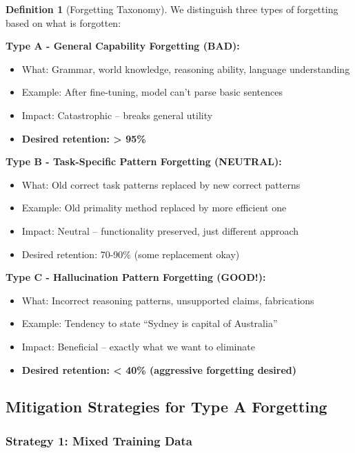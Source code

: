 \documentclass[12pt,a4paper]{article}
\theoremstyle{definition}
\newtheorem{definition}[theorem]{Definition}
\begin{document}
\begin{definition}[Forgetting Taxonomy]
We distinguish three types of forgetting based on what is forgotten:

\textbf{Type A - General Capability Forgetting (BAD):}
\begin{itemize}
    \item What: Grammar, world knowledge, reasoning ability, language understanding
    \item Example: After fine-tuning, model can't parse basic sentences
    \item Impact: Catastrophic -- breaks general utility
    \item \textbf{Desired retention: > 95\%}
\end{itemize}

\textbf{Type B - Task-Specific Pattern Forgetting (NEUTRAL):}
\begin{itemize}
    \item What: Old correct task patterns replaced by new correct patterns
    \item Example: Old primality method replaced by more efficient one
    \item Impact: Neutral -- functionality preserved, just different approach
    \item Desired retention: 70-90\% (some replacement okay)
\end{itemize}

\textbf{Type C - Hallucination Pattern Forgetting (GOOD!):}
\begin{itemize}
    \item What: Incorrect reasoning patterns, unsupported claims, fabrications
    \item Example: Tendency to state ``Sydney is capital of Australia''
    \item Impact: Beneficial -- exactly what we want to eliminate
    \item \textbf{Desired retention: < 40\% (aggressive forgetting desired)}
\end{itemize}
\end{definition}

\subsection{Mitigation Strategies for Type A Forgetting}

\subsubsection{Strategy 1: Mixed Training Data}
\end{document}
